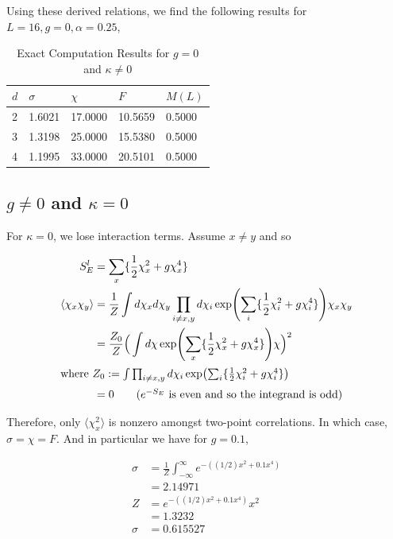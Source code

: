 \documentclass[12]{report}
\newcommand\0{\mathbf{0}}
\newcommand\<{\langle}
\renewcommand\>{\rangle}
\begin{document}
Using these derived relations, we find the following results for $L = 16, g = 0, \alpha = 0.25$,

\begin{table}[H]
\label{table:exact-kappa}
\centering
\begin{tabular}{|l|l|l|l|l|}
\hline
$d$ & $\sigma$          & $\chi$             & $F$                & $M(L)$ \\ \hline
2   & 1.6021 & 17.0000 & 10.5659 & 0.5000    \\
3   & 1.3198 & 25.0000  & 15.5380 &   0.5000  \\
4   & 1.1995  &  33.0000  & 20.5101  &    0.5000 \\ \hline
\end{tabular}
\caption{Exact Computation Results for $g=0$ and $\kappa \neq 0$}
\end{table}

\subsection{$g\neq 0$ and $\kappa = 0$}
\label{sec:no-interaction-exact}

For $\kappa = 0$, we lose interaction terms. Assume $x \neq y$ and so

\begin{align*}
S^l_E &= \sum_x \{ \frac{1}{2} \chi_x^2 + g \chi_x^4 \} \\
\< \chi_x \chi_y \> &= \frac{1}{Z} \int d \chi_x d \chi_y \prod_{i \neq x, y} d \chi_i \exp(\sum_i \{ \frac{1}{2} \chi_i^2 + g \chi_i^4 \}) \chi_x \chi_y \\
&= \frac{Z_0}{Z} \Big(\int d \chi \exp(\sum_x \{ \frac{1}{2} \chi_x^2 + g \chi_x^4 \}) \chi \Big)^2 \\
\intertext{where $Z_0 := \int \prod_{i \neq x, y} d \chi_i \exp(\sum_i \{ \frac{1}{2} \chi_i^2 + g \chi_i^4 \})$}
&= 0 \tag{$e^{-S_E}$ is even and so the integrand is odd}
\end{align*}

Therefore, only $\< \chi_x^2 \>$ is nonzero amongst two-point correlations. In which case, $\sigma = \chi = F$. And in particular we have for $g= 0.1$,

\begin{align*}
\sigma &= \frac{1}{Z}\int_{-\infty}^\infty  e^{- ((1/2) x^2 + 0.1 x^4)} \\
&= 2.14971 \\
Z &= e^{- ((1/2) x^2 + 0.1 x^4)} x^2 \\
&= 1.3232 \\
\sigma &= 0.615527
\end{align*}
\end{document}
